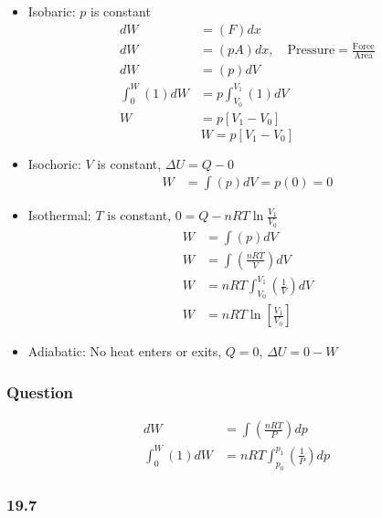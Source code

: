 \documentclass{article}
\begin{document}
\begin{itemize}
	\item Isobaric: $ p $ is constant
		\begin{align*}
			dW & = (F) dx \\
			dW & = (pA) dx, \quad \text{Pressure} = \frac{ \text{Force} }{ \text{Area} } \\
			dW & = (p) dV \\
			\int_{0}^{W} (1) dW & = p \int_{V_0}^{V_1} (1) dV \\
			W & = p \left[ V_1 - V_0 \right]
		\end{align*}
		\begin{equation}
			W = p \left[ V_1 - V_0 \right]
		\end{equation}
	\item Isochoric: $ V $ is constant, $ \Delta U = Q - 0 $
		\begin{align*}
			W & = \int (p) dV = p(0) = 0
		\end{align*}
	\item Isothermal: $ T $ is constant, $ 0 = Q - nRT \ln \frac{ V_1 }{ V_0 } $
		\begin{align*}
			W & = \int (p) dV \\
			W & = \int \left( \frac{ nRT }{ V } \right) dV \\
			W & = nRT \int_{V_0}^{V_1} \left( \frac{ 1 }{ V } \right) dV \\
			W & = nRT \ln \left[ \frac{ V_1 }{ V_0 } \right]
		\end{align*}
	\item Adiabatic: No heat enters or exits, $ Q = 0 $, $ \Delta U = 0 - W $
\end{itemize}

\subsubsection{Question}

\begin{align*}
	dW & = \int \left( \frac{ nRT }{ P } \right) dp \\
	\int_{0}^{W} (1) dW & = nRT \int_{p_0}^{p_1} \left( \frac{ 1 }{ P } \right) dp
\end{align*}

\subsubsection{19.7}
\end{document}

